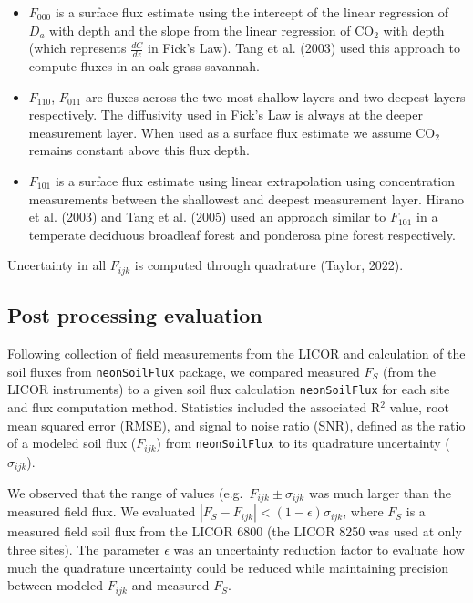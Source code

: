 \documentclass[
  letterpaper,
  DIV=11,
  numbers=noendperiod]{scrartcl}
\providecommand{\tightlist}{%
  \setlength{\itemsep}{0pt}\setlength{\parskip}{0pt}}\usepackage{longtable,booktabs,array}
\begin{document}
\begin{itemize}
\tightlist
\item
  \(F_{000}\) is a surface flux estimate using the intercept of the
  linear regression of \(D_{a}\) with depth and the slope from the
  linear regression of CO\(_{2}\) with depth (which represents
  \(\displaystyle \frac{dC}{dz}\) in Fick's Law). Tang et al. (2003)
  used this approach to compute fluxes in an oak-grass savannah.
\item
  \(F_{110}\), \(F_{011}\) are fluxes across the two most shallow layers
  and two deepest layers respectively. The diffusivity used in Fick's
  Law is always at the deeper measurement layer. When used as a surface
  flux estimate we assume CO\(_{2}\) remains constant above this flux
  depth.
\item
  \(F_{101}\) is a surface flux estimate using linear extrapolation
  using concentration measurements between the shallowest and deepest
  measurement layer. Hirano et al. (2003) and Tang et al. (2005) used an
  approach similar to \(F_{101}\) in a temperate deciduous broadleaf
  forest and ponderosa pine forest respectively.
\end{itemize}

Uncertainty in all \(F_{ijk}\) is computed through quadrature (Taylor,
2022).

\subsection{Post processing evaluation}\label{sec-post-process}

Following collection of field measurements from the LICOR and
calculation of the soil fluxes from \texttt{neonSoilFlux} package, we
compared measured \(F_{S}\) (from the LICOR instruments) to a given soil
flux calculation \texttt{neonSoilFlux} for each site and flux
computation method. Statistics included the associated R\(^{2}\) value,
root mean squared error (RMSE), and signal to noise ratio (SNR), defined
as the ratio of a modeled soil flux (\(F_{ijk}\)) from
\texttt{neonSoilFlux} to its quadrature uncertainty (\(\sigma_{ijk}\)).

We observed that the range of values (e.g.~\(F_{ijk} \pm \sigma_{ijk}\)
was much larger than the measured field flux. We evaluated
\(| F_{S} - F_{ijk} | < (1-\epsilon) \sigma_{ijk}\), where \(F_{S}\) is
a measured field soil flux from the LICOR 6800 (the LICOR 8250 was used
at only three sites). The parameter \(\epsilon\) was an uncertainty
reduction factor to evaluate how much the quadrature uncertainty could
be reduced while maintaining precision between modeled \(F_{ijk}\) and
measured \(F_{S}\).
\end{document}
